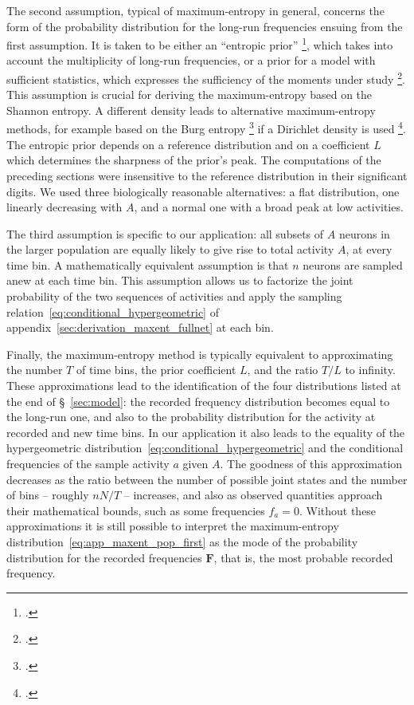 \documentclass[\ifafour a4paper,12pt,\else a5paper,10pt,\fi%
onecolumn,oneside,article,%
british%
]{memoir}
\theoremstyle{remark}
\theoremstyle{innote}
\newcommand*{\citep}{\footcites}
\renewcommand*{\|}{\nonscript\,\vert\nonscript\;\mathopen{}}
\newcommand*{\sect}{\S}%
\newcommand*{\yAv}{A}
\newcommand*{\yav}{a}
\newcommand*{\yFF}{F}
\newcommand*{\yff}{f}
\newcommand*{\yF}{\bm{\yFF}}
\newcommand*{\ya}{\yav}%
\newcommand*{\yA}{\yAv}%
\begin{document}
The second assumption, typical of maximum-entropy in general, concerns the
form of the probability distribution for the long-run frequencies ensuing
from the first assumption. It is taken to be either an \enquote{entropic
  prior} \citep{skillingetal1984,rodriguez1991,neumann2007}, which takes
into account the multiplicity of long-run frequencies, or a prior for a
model with sufficient statistics, which expresses the sufficiency of the
moments under study \citep{portamana2017}. This assumption is crucial for
deriving the maximum-entropy based on the Shannon entropy. A different
density leads to alternative maximum-entropy methods, for example based on
the Burg entropy \citep{burg1975} if a Dirichlet density is used
\citep{jaynes1986d_r1996}. The entropic prior depends on a reference
distribution and on a coefficient $L$ which determines the sharpness of the
prior's peak. The computations of the preceding sections were insensitive
to the reference distribution in their significant digits. We used three
biologically reasonable alternatives: a flat distribution, one linearly
decreasing with $\yA$, and a normal one with a broad peak at low
activities.

The third assumption is specific to our application: all subsets of $\yA$
neurons in the larger population are equally likely to give rise to total
activity $\yA$, at every time bin. A mathematically equivalent assumption
is that $n$ neurons are sampled anew at each time bin. This assumption
allows us to factorize the joint probability of the two sequences of
activities and apply the sampling
relation~\eqref{eq:conditional_hypergeometric} of
appendix~\ref{sec:derivation_maxent_fullnet} at each bin.

Finally, the maximum-entropy method is typically equivalent to
approximating the number $T$ of time bins, the prior coefficient $L$, and
the ratio $T/L$ to infinity. These approximations lead to the
identification of the four distributions listed at the end of
\sect~\ref{sec:model}: the recorded frequency distribution becomes equal to
the long-run one, and also to the probability distribution for the activity
at recorded and new time bins. In our application it also leads to the
equality of the hypergeometric
distribution~\eqref{eq:conditional_hypergeometric} and the conditional
frequencies of the sample activity $\ya$ given $\yA$. The goodness of this
approximation decreases as the ratio between the number of possible joint
states and the number of bins -- roughly $nN/T$ -- increases, and also as
observed quantities approach their mathematical bounds, such as some
frequencies $\yff_{\ya}=0$. Without these approximations it is still
possible to interpret the maximum-entropy
distribution~\eqref{eq:app_maxent_pop_first} as the mode of the probability
distribution for the recorded frequencies $\yF$, that is, the most probable
recorded frequency.
\end{document}
